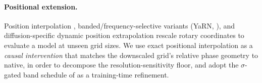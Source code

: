 \paragraph{Positional extension.}
Position interpolation \citep{chen2023pi}, banded/frequency-selective
variants (YaRN, \citealp{peng2024yarn}), and diffusion-specific dynamic
position extrapolation \citep{issachar2025dype,zhao2026sigma} rescale
rotary coordinates to evaluate a model at unseen grid sizes. We use
exact positional interpolation as a \emph{causal intervention} that
matches the downscaled grid's relative phase geometry to native, in
order to decompose the resolution-sensitivity floor, and adopt the
$\sigma$-gated band schedule of \citet{zhao2026sigma} as a
training-time refinement.
